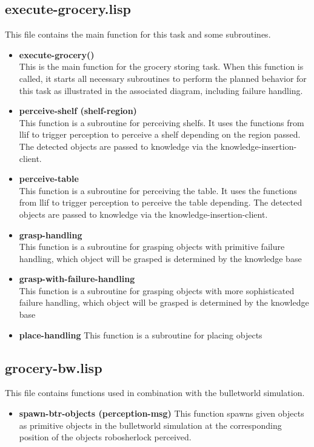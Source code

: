 \documentclass[main.tex]{subfiles}
\begin{document}
		\subsection{execute-grocery.lisp}
		This file contains the main function for this task and some subroutines.
		\begin{itemize}
			\item \textbf{execute-grocery()} \\
			This is the main function for the grocery storing task. When this function is called, it starts all necessary subroutines to perform the planned behavior for this task as illustrated in the associated diagram, including failure handling.
			\item \textbf{perceive-shelf (shelf-region)} \\
			This function is a subroutine for perceiving shelfs. It uses the functions from llif to trigger perception to perceive a shelf depending on the region passed. The detected objects are passed to knowledge via the knowledge-insertion-client.
			\item \textbf{perceive-table} \\
			This function is a subroutine for perceiving the table. It uses the functions from llif to trigger perception to perceive the table depending. The detected objects are passed to knowledge via the knowledge-insertion-client.
			\item \textbf{grasp-handling} \\
			This function is a subroutine for grasping objects with primitive failure handling, which object will be grasped is determined by the knowledge base
			\item \textbf{grasp-with-failure-handling} \\
			This function is a subroutine for grasping objects with more sophisticated failure handling, which object will be grasped is determined by the knowledge base
			\item \textbf{place-handling}
			This function is a subroutine for placing objects
		\end{itemize}
		
		\subsection{grocery-bw.lisp}
		This file contains functions used in combination with the bulletworld simulation.
		\begin{itemize}
			\item \textbf{spawn-btr-objects (perception-msg)}
			This function spawns given objects as primitive objects in the bulletworld simulation at the corresponding position of the objects robosherlock perceived.  
		\end{itemize}
	  	
\end{document}
